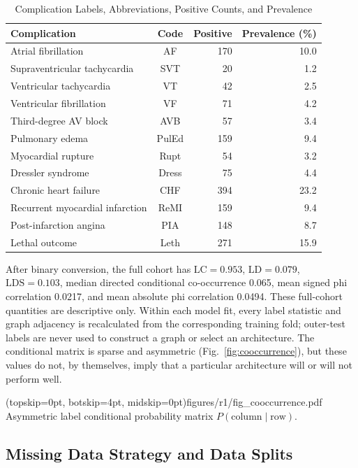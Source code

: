 \documentclass{ieeeaccess}
\begin{document}
\begin{table}[ht]
\caption{Complication Labels, Abbreviations, Positive Counts, and Prevalence}
\label{tab:labels}
\centering
\setlength{\tabcolsep}{3pt}
\begin{tabular}{lcrr}
\toprule
\textbf{Complication} & \textbf{Code} & \textbf{Positive} & \textbf{Prevalence (\%)} \\
\midrule
Atrial fibrillation & AF & 170 & 10.0 \\
Supraventricular tachycardia & SVT & 20 & 1.2 \\
Ventricular tachycardia & VT & 42 & 2.5 \\
Ventricular fibrillation & VF & 71 & 4.2 \\
Third-degree AV block & AVB & 57 & 3.4 \\
Pulmonary edema & PulEd & 159 & 9.4 \\
Myocardial rupture & Rupt & 54 & 3.2 \\
Dressler syndrome & Dress & 75 & 4.4 \\
Chronic heart failure & CHF & 394 & 23.2 \\
Recurrent myocardial infarction & ReMI & 159 & 9.4 \\
Post-infarction angina & PIA & 148 & 8.7 \\
Lethal outcome & Leth & 271 & 15.9 \\
\bottomrule
\end{tabular}
\end{table}

After binary conversion, the full cohort has $\mathrm{LC}=0.953$, $\mathrm{LD}=0.079$, $\mathrm{LDS}=0.103$, median directed conditional co-occurrence 0.065, mean signed phi correlation 0.0217, and mean absolute phi correlation 0.0494. These full-cohort quantities are descriptive only. Within each model fit, every label statistic and graph adjacency is recalculated from the corresponding training fold; outer-test labels are never used to construct a graph or select an architecture. The conditional matrix is sparse and asymmetric (Fig.~\ref{fig:cooccurrence}), but these values do not, by themselves, imply that a particular architecture will or will not perform well.

\Figure[ht](topskip=0pt, botskip=4pt, midskip=0pt){figures/r1/fig_cooccurrence.pdf}
{Asymmetric label conditional probability matrix $P(\text{column} \mid \text{row})$.\label{fig:cooccurrence}}

\subsection{Missing Data Strategy and Data Splits}
\end{document}
